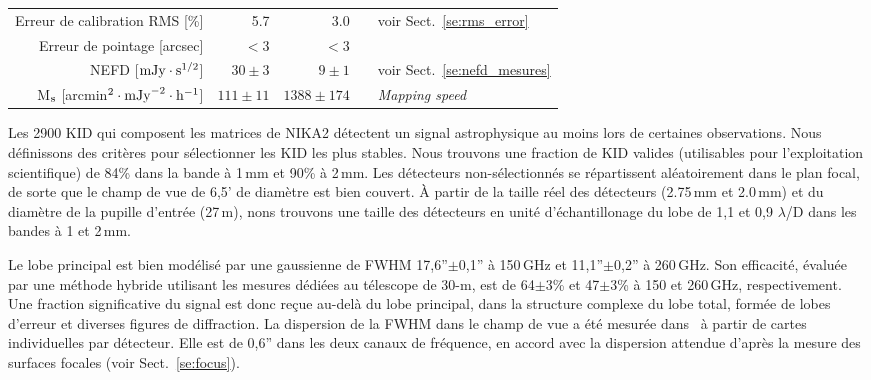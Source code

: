 \begin{table}[!thbp]
\begin{tabular}{rrrcl}
  Erreur de calibration RMS [\%]          &   5.7       &     3.0       & & \footnotesize{voir Sect.~\ref{se:rms_error}} \\
  Erreur de pointage    [arcsec]          & $<3$ &  $<3$  & & \footnotesize{\citet{Greve1996}} \\
  \hline
  \noalign{\smallskip}
  NEFD \hspace{3mm} [$\rm{mJy} \cdot \rm{s}^{1/2}$]  & $30 \pm 3$  & $9 \pm 1$ &  & \footnotesize{voir Sect.~\ref{se:nefd_mesures}}\\
  M$_{\rm{s}}$\hspace{3mm} [arcmin$^2 \cdot
    \rm{mJy}^{-2} \cdot \rm{h}^{-1}$] & $111 \pm 11$  &  $1388 \pm 174$ &  & \footnotesize{\emph{Mapping speed}}\\
  \hline
  \end{tabular}
\end{table}

Les 2900 KID qui composent les matrices de NIKA2 détectent un signal
astrophysique au moins lors de certaines observations. Nous
définissons des critères pour sélectionner les KID les plus
stables. Nous trouvons une fraction de KID valides (utilisables pour
l'exploitation scientifique) de 84\% dans la bande à 1\,mm et 90\% à
2\,mm. Les détecteurs non-sélectionnés se répartissent aléatoirement
dans le plan focal, de sorte que le champ de vue de 6,5' de diamètre
est bien couvert. \`A partir de la taille réel des détecteurs
(2.75\,mm et 2.0\,mm) et du diamètre de la pupille d'entrée (27\,m),
nons trouvons une taille des détecteurs en unité d'échantillonage du
lobe de 1,1 et 0,9 $\lambda$/D dans les bandes à 1 et 2\,mm.   

Le lobe principal est bien modélisé par une gaussienne de FWHM
17,6''$\pm$0,1'' à 150\,GHz et 11,1''$\pm$0,2'' à 260\,GHz. Son
efficacité, évaluée par une méthode hybride utilisant les mesures
dédiées au télescope de 30-m, est de 64$\pm$3\% et 47$\pm$3\% à 150 et
260\,GHz, respectivement. Une fraction significative du signal est
donc reçue au-delà du lobe principal, dans la structure complexe du lobe
total, formée de lobes d'erreur et diverses figures de diffraction. La
dispersion de la FWHM dans le champ de vue a été mesurée
dans~\citet{Adam2018} à partir de cartes individuelles par
détecteur. Elle est de 0,6'' dans les deux
canaux de fréquence, en accord avec la dispersion attendue d'après la
mesure des surfaces focales (voir Sect.~\ref{se:focus}).   

